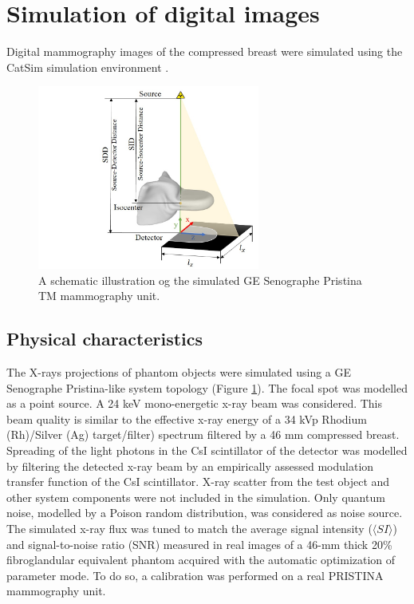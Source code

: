 \section{Simulation of digital images }
Digital mammography images of the compressed breast were simulated using the CatSim simulation environment \citep{de_low_2014,de_catsim_2007}. 


\begin{figure}[!h]
\centering
\includegraphics[width=0.65\textwidth,keepaspectratio]{figures/systemgeometry.jpg} 
\caption{A schematic illustration og the simulated GE Senographe Pristina TM mammography unit.}
\label{fig:systemgeometry}
\end{figure}


\subsection{Physical characteristics}
The X-rays projections of phantom objects were simulated using a GE Senographe Pristina-like system topology (Figure \ref{fig:systemgeometry}). The focal spot was modelled as a point source. A 24 keV mono-energetic x-ray beam was considered.  This beam quality is similar to the effective x-ray energy of a 34 kVp Rhodium (Rh)/Silver (Ag) target/filter) spectrum filtered by a 46 mm compressed breast. Spreading of the light photons in the CsI scintillator of the detector was modelled by filtering the detected x-ray beam by an empirically assessed modulation transfer function of the CsI scintillator. X-ray scatter from the test object and other system components were not included in the simulation. Only quantum noise, modelled by a Poison random distribution, was considered as noise source. The simulated x-ray flux was tuned to match the average signal intensity ($\langle SI \rangle$) and signal-to-noise ratio (SNR) measured in real images of a 46-mm thick 20\% fibroglandular equivalent phantom acquired with the automatic optimization of parameter mode. To do so, a calibration was performed on a real PRISTINA mammography unit. 

